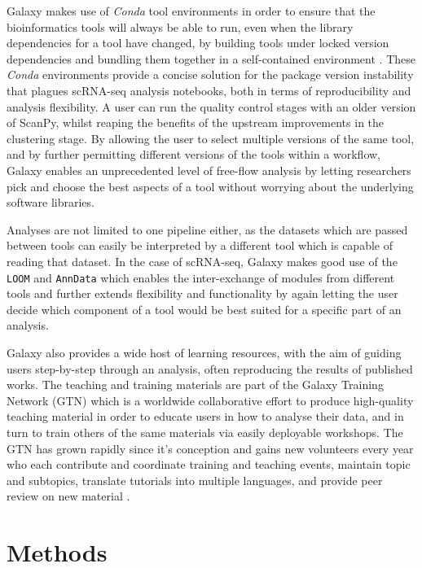 \documentclass[a4paper,num-refs]{oup-contemporary}
\newcommand{\prog}[1]{\textit{#1}}
\newcommand{\fileformat}[1]{\texttt{#1}}
\begin{document}
Galaxy makes use of \prog{Conda} tool environments in order to ensure that the bioinformatics tools will always be able to run, even when the library dependencies for a tool have changed, by building tools under locked version dependencies and bundling them together in a self-contained environment \citep{gruning2018bioconda}. These \prog{Conda} environments provide a concise solution for the package version instability that plagues scRNA-seq analysis notebooks, both in terms of reproducibility and analysis flexibility. A user can run the quality control stages with an older version of ScanPy, whilst reaping the benefits of the upstream improvements in the clustering stage. By allowing the user to select multiple versions of the same tool, and by further permitting different versions of the tools within a workflow, Galaxy enables an unprecedented level of free-flow analysis by letting researchers pick and choose the best aspects of a tool without worrying about the underlying software libraries.

Analyses are not limited to one pipeline either, as the datasets which are passed between tools can easily be interpreted by a different tool which is capable of reading that dataset. In the case of scRNA-seq, Galaxy makes good use of the \fileformat{LOOM} and \fileformat{AnnData} which enables the inter-exchange of modules from different tools and further extends flexibility and functionality by again letting the user decide which component of a tool would be best suited for a specific part of an analysis.

Galaxy also provides a wide host of learning resources, with the aim of guiding users step-by-step through an analysis, often reproducing the results of published works. The teaching and training materials are part of the Galaxy Training Network (GTN) which is a worldwide collaborative effort to produce high-quality teaching material in order to educate users in how to analyse their data, and in turn to train others of the same materials via easily deployable workshops.
The GTN has grown rapidly since it's conception and gains new volunteers every year who each contribute and coordinate training and teaching events, maintain topic and subtopics, translate tutorials into multiple languages, and provide peer review on new material \citep{batut2018cell}.


\section{Methods}
\end{document}
